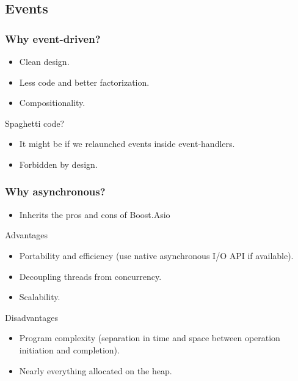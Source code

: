 \documentclass[xcolor=dvipsnames]{beamer}
\begin{document}
\subsection{Events}

\begin{frame}
\frametitle{Why event-driven?}

\begin{itemize}
  \item Clean design.
  \item Less code and better factorization.
  \item Compositionality.
\end{itemize}

\begin{block}{Spaghetti code?}
\begin{itemize}
  \item It might be if we relaunched events inside event-handlers.
  \item Forbidden by design.
\end{itemize}
\end{block}
\end{frame}

\begin{frame}
\frametitle{Why asynchronous?}

\begin{itemize}
\item Inherits the pros and cons of Boost.Asio
\end{itemize}

\begin{exampleblock}{Advantages}
\begin{itemize}
  \item Portability and efficiency (use native asynchronous I/O API if available).
  \item Decoupling threads from concurrency.
  \item Scalability.
\end{itemize}
\end{exampleblock}

\begin{alertblock}{Disadvantages}
\begin{itemize}
  \item Program complexity (separation in time and space between operation initiation and completion).
  \item Nearly everything allocated on the heap.
\end{itemize}
\end{alertblock}

\end{frame}
\end{document}
